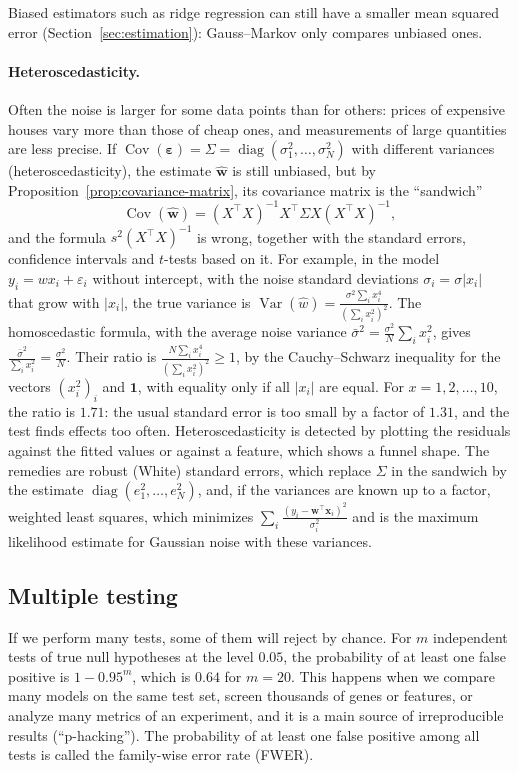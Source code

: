 \documentclass[11pt]{article}
\DeclareMathOperator{\Var}{Var}
\DeclareMathOperator{\Cov}{Cov}
\theoremstyle{definition}
\theoremstyle{plain}
\theoremstyle{remark}
\DeclareMathOperator{\diag}{diag}
\begin{document}
Biased estimators such as ridge regression can still have a smaller mean squared error (Section~\ref{sec:estimation}): Gauss--Markov only compares unbiased ones.

\paragraph{Heteroscedasticity.} Often the noise is larger for some data points than for others: prices of expensive houses vary more than those of cheap ones, and measurements of large quantities are less precise. If $\Cov(\boldsymbol{\varepsilon}) = \Sigma = \diag(\sigma_1^2, \ldots, \sigma_N^2)$ with different variances (heteroscedasticity), the estimate $\hat{\mathbf{w}}$ is still unbiased, but by Proposition~\ref{prop:covariance-matrix}, its covariance matrix is the ``sandwich''
\[\Cov(\hat{\mathbf{w}}) = (X^\top X)^{-1}X^\top\Sigma X(X^\top X)^{-1},\]
and the formula $s^2(X^\top X)^{-1}$ is wrong, together with the standard errors, confidence intervals and $t$-tests based on it. For example, in the model $y_i = wx_i + \varepsilon_i$ without intercept, with the noise standard deviations $\sigma_i = \sigma|x_i|$ that grow with $|x_i|$, the true variance is $\Var(\hat w) = \frac{\sigma^2\sum_i x_i^4}{(\sum_i x_i^2)^2}$. The homoscedastic formula, with the average noise variance $\bar\sigma^2 = \frac{\sigma^2}{N}\sum_i x_i^2$, gives $\frac{\bar\sigma^2}{\sum_i x_i^2} = \frac{\sigma^2}{N}$. Their ratio is $\frac{N\sum_i x_i^4}{(\sum_i x_i^2)^2} \geq 1$, by the Cauchy--Schwarz inequality for the vectors $(x_i^2)_i$ and $\mathbf{1}$, with equality only if all $|x_i|$ are equal. For $x = 1, 2, \ldots, 10$, the ratio is $1.71$: the usual standard error is too small by a factor of $1.31$, and the test finds effects too often. Heteroscedasticity is detected by plotting the residuals against the fitted values or against a feature, which shows a funnel shape. The remedies are robust (White) standard errors, which replace $\Sigma$ in the sandwich by the estimate $\diag(e_1^2, \ldots, e_N^2)$, and, if the variances are known up to a factor, weighted least squares, which minimizes $\sum_i \frac{(y_i - \mathbf{w}^\top\mathbf{x}_i)^2}{\sigma_i^2}$ and is the maximum likelihood estimate for Gaussian noise with these variances.

\subsection{Multiple testing}

If we perform many tests, some of them will reject by chance. For $m$ independent tests of true null hypotheses at the level $0.05$, the probability of at least one false positive is $1 - 0.95^m$, which is $0.64$ for $m = 20$. This happens when we compare many models on the same test set, screen thousands of genes or features, or analyze many metrics of an experiment, and it is a main source of irreproducible results (``p-hacking''). The probability of at least one false positive among all tests is called the family-wise error rate (FWER).
\end{document}
